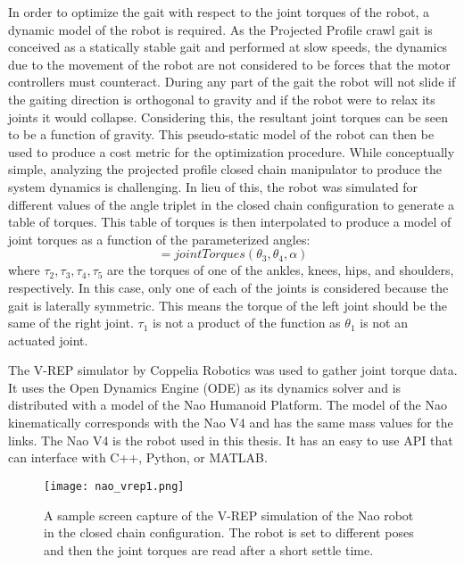In order to optimize the gait with respect to the joint torques of the robot, a dynamic model of the robot is required.
As the Projected Profile crawl gait is conceived as a statically stable gait and performed at slow speeds,
the dynamics due to the movement of the robot are not considered to be forces that the 
motor controllers must counteract. 
During any part of the gait the robot will not slide if the gaiting direction is orthogonal to gravity and
if the robot were to relax its joints it would collapse.
Considering this, the resultant joint torques can be seen to be a function of gravity. 
This pseudo-static model of the robot can then be used to produce a cost metric for the optimization procedure.
While conceptually simple, analyzing the projected profile closed chain manipulator to produce the 
system dynamics is challenging.
In lieu of this, the robot was simulated for different values of the angle triplet in the closed chain 
configuration to generate a table of torques. This table of torques is then interpolated to produce
a model of joint torques as a function of the parameterized angles:
\begin{equation}
	[\tau_2, \tau_2, \tau_4, \tau_5] = jointTorques(\theta_3, \theta_4, \alpha)
\end{equation}
where $\tau_2, \tau_3, \tau_4, \tau_5$ are the torques of one of the ankles, knees, hips, and shoulders, respectively.
In this case, only one of each of the joints is considered because the gait is laterally symmetric. This means
the torque of the left joint should be the same of the right joint.
$\tau_1$ is not a product of the function as $\theta_1$ is not an actuated joint.

The V-REP simulator by Coppelia Robotics was used to gather joint torque data. It uses the Open Dynamics Engine (ODE)
as its dynamics solver and is distributed with a model of the Nao Humanoid Platform. The model of the Nao
kinematically corresponds with the Nao V4 and has the same mass values for the links. 
The Nao V4 is the robot used in this thesis.
It has an easy to use API that can interface with C++, Python, or MATLAB.

\begin{figure}
	\texttt{[image: nao\_vrep1.png]}
  	\caption{A sample screen capture of the V-REP simulation of the Nao robot in the closed
  			 chain configuration. The robot is set to different poses and then the joint torques
             are read after a short settle time.}
  	\label{fig:nao_vrep1}
\end{figure}

